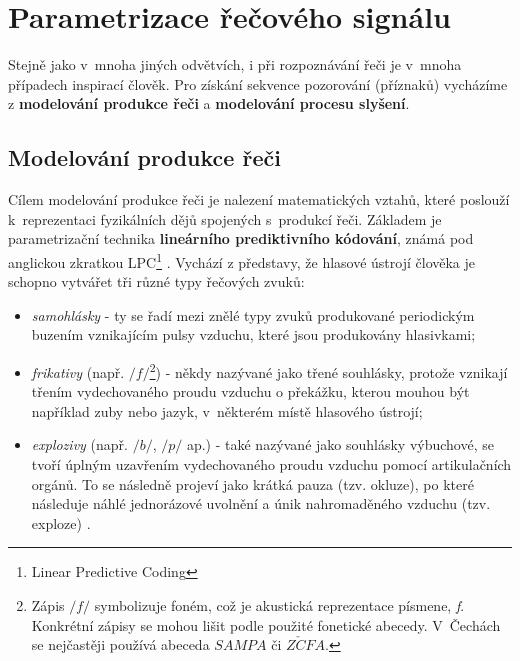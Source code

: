 \section{Parametrizace řečového signálu}
\label{chap:asr:parametrization}

Stejně jako v~mnoha jiných odvětvích, i při rozpoznávání řeči je v~mnoha případech inspirací člověk. Pro získání sekvence pozorování (příznaků) vycházíme z \textbf{modelování produkce řeči} a \textbf{modelování procesu slyšení}.

\subsection{Modelování produkce řeči}
\label{chap:asr:parametrization:production}

Cílem modelování produkce řeči je nalezení matematických vztahů, které poslouží k~reprezentaci fyzikálních dějů spojených s~produkcí řeči. Základem je parametrizační technika \textbf{lineárního prediktivního kódování}, známá pod anglickou zkratkou LPC\footnote{Linear Predictive Coding} \cite{Benesty2007}. Vychází z představy, že hlasové ústrojí člověka je schopno vytvářet tři různé typy řečových zvuků:

\begin{itemize}
  \item \textit{samohlásky} - ty se řadí mezi znělé typy zvuků produkované periodickým buzením vznikajícím pulsy vzduchu, které jsou produkovány hlasivkami;
  \item \textit{frikativy} (např. $/f/$\footnote{Zápis $/f/$ symbolizuje foném, což je akustická reprezentace písmene, \textit{f}. Konkrétní zápisy se mohou lišit podle použité fonetické abecedy. V~Čechách se nejčastěji používá abeceda $SAMPA$ či $Z\check{C}FA$.}) - někdy nazývané jako třené souhlásky, protože vznikají třením vydechovaného proudu vzduchu o překážku, kterou mouhou být například zuby nebo jazyk, v~některém místě hlasového ústrojí;
  \item \textit{explozivy} (např. $/b/$, $/p/$ ap.) - také nazývané jako souhlásky výbuchové, se tvoří úplným uzavřením vydechovaného proudu vzduchu pomocí artikulačních orgánů. To se následně projeví jako krátká pauza (tzv. okluze), po které následuje náhlé jednorázové uvolnění a únik nahromaděného vzduchu (tzv. exploze) \cite{Psutka2006}.
\end{itemize}

